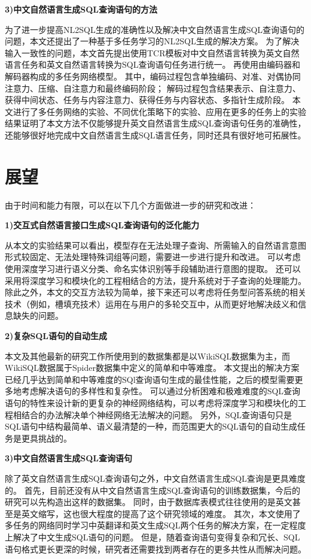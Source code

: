 \textbf{3)中文自然语言生成SQL查询语句的方法}

为了进一步提高NL2SQL生成的准确性以及解决中文自然语言生成SQL查询语句的问题，本文还提出了一种基于多任务学习的NL2SQL生成的解决方案。
为了解决输入一致性的问题，本文首先提出使用TCR模板对中文自然语言转换为英文自然语言任务和英文自然语言转换为SQL查询语句任务进行统一。
再使用由编码器和解码器构成的多任务网络模型。
其中，编码过程包含单独编码、对准、对偶协同注意力、压缩、自注意力和最终编码阶段；
解码过程包含结果表示、自注意力、获得中间状态、任务与内容注意力、获得任务与内容状态、多指针生成阶段。
本文进行了多任务网络的实验、不同优化策略下的实验、应用在更多的任务上的实验结果证明了本文方法不仅能够提升英文自然语言生成SQL查询语句任务的准确性，还能够很好地完成中文自然语言生成SQL语言任务，同时还具有很好地可拓展性。

\section{展望}

由于时间和能力有限，可以在以下几个方面做进一步的研究和改进：

\textbf{1)交互式自然语言接口生成SQL查询语句的泛化能力}

从本文的实验结果可以看出，模型存在无法处理子查询、所需输入的自然语言意图形式较固定、无法处理特殊词组等问题，需要进一步进行提升和改进。
可以考虑使用深度学习进行语义分类、命名实体识别等手段辅助进行意图的提取。
还可以采用将深度学习和模块化的工程相结合的方法，提升系统对于子查询的处理能力。
除此之外，本文的交互方法较为简单，接下来还可以考虑将任务型问答系统的相关技术（例如，槽填充技术）运用在与用户的多轮交互中，从而更好地解决歧义和信息缺失的问题。


\textbf{2)复杂SQL语句的自动生成}

本文及其他最新的研究工作所使用到的数据集都是以WikiSQL数据集为主，而WikiSQL数据属于Spider数据集中定义的简单和中等难度。
本文提出的解决方案已经几乎达到简单和中等难度的SQl查询语句生成的最佳性能，之后的模型需要更多地考虑解决语句的多样性和复杂性。
可以通过分析困难和极难难度的SQL查询语句的特性来设计新的更复杂的神经网络结构，可以考虑将深度学习和模块化的工程相结合的办法解决单个神经网络无法解决的问题。
另外，SQL查询语句只是SQL语句中结构最简单、语义最清楚的一种，而范围更大的SQL语句的自动生成任务是更具挑战的。

\textbf{3)中文自然语言生成SQL查询语句}

除了英文自然语言生成SQL查询语句之外，中文自然语言生成SQL查询是更具难度的。
首先，目前还没有从中文自然语言生成SQL查询语句的训练数据集，今后的研究可以先构造出这样的数据集。
同时，由于数据库表模式往往使用的是英文甚至是英文缩写，这也很大程度的提高了这个研究领域的难度。
其次，本文使用了多任务的网络同时学习中英翻译和英文生成SQL两个任务的解决方案，在一定程度上解决了中文生成SQL语句的问题。
但是，随着查询语句变得复杂和冗长、SQL语句格式更长更深的时候，研究者还需要找到两者存在的更多共性从而解决问题。



